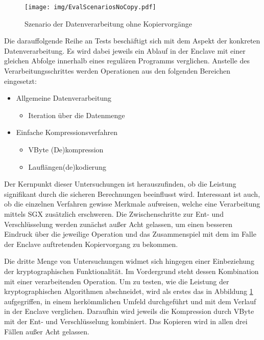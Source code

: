 \begin{figure}[h]
	\texttt{[image: img/EvalScenariosNoCopy.pdf]}
	\centering
	\caption{Szenario der Datenverarbeitung ohne Kopiervorgänge}
	\label{fig:scenarionocopy}
\end{figure}
Die darauffolgende Reihe an Tests beschäftigt sich mit dem Aspekt der konkreten Datenverarbeitung. Es wird dabei jeweils ein Ablauf in der Enclave mit einer gleichen Abfolge innerhalb eines regulären Programms verglichen. Anstelle des Verarbeitungsschrittes werden Operationen aus den folgenden Bereichen eingesetzt:

\begin{itemize}
	\item Allgemeine Datenverarbeitung
	\begin{itemize}
		\item Iteration über die Datenmenge
	\end{itemize}
	\item Einfache Kompressionsverfahren
	\begin{itemize}
		\item VByte (De)kompression
		\item Lauflängen(de)kodierung
	\end{itemize}
\end{itemize}

Der Kernpunkt dieser Untersuchungen ist herauszufinden, ob die Leistung signifikant durch die sicheren Berechnungen beeinflusst wird. Interessant ist auch, ob die einzelnen Verfahren gewisse Merkmale aufweisen, welche eine Verarbeitung mittels SGX zusätzlich erschweren. Die Zwischenschritte zur Ent- und Verschlüsselung werden zunächst außer Acht gelassen, um einen besseren Eindruck über die jeweilige Operation und das Zusammenspiel mit dem im Falle der Enclave auftretenden Kopiervorgang zu bekommen.

Die dritte Menge von Untersuchungen widmet sich hingegen einer Einbeziehung der kryptographischen Funktionalität. Im Vordergrund steht dessen Kombination mit einer verarbeitenden Operation. Um zu testen, wie die Leistung der kryptographischen Algorithmen abschneidet, wird als erstes das in Abbildung \ref{fig:scenarionocopy} aufgegriffen, in einem herkömmlichen Umfeld durchgeführt und mit dem Verlauf in der Enclave verglichen. Daraufhin wird jeweils die Kompression durch VByte mit der Ent- und Verschlüsselung kombiniert. Das Kopieren wird in allen drei Fällen außer Acht gelassen.

